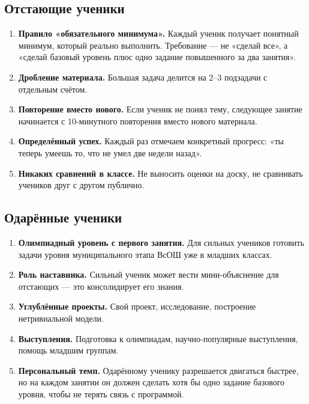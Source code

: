 \documentclass[12pt,a4paper]{article}
\begin{document}
\subsection{Отстающие ученики}

\begin{enumerate}
  \item \textbf{Правило «обязательного минимума».} Каждый ученик
  получает понятный минимум, который реально выполнить. Требование
  --- не «сделай все», а «сделай базовый уровень плюс одно задание
  повышенного за два занятия».
  \item \textbf{Дробление материала.} Большая задача делится на
  2--3 подзадачи с отдельным счётом.
  \item \textbf{Повторение вместо нового.} Если ученик не понял тему,
  следующее занятие начинается с 10-минутного повторения вместо
  нового материала.
  \item \textbf{Определённый успех.} Каждый раз отмечаем конкретный
  прогресс: «ты теперь умеешь то, что не умел две недели назад».
  \item \textbf{Никаких сравнений в классе.} Не выносить оценки
  на доску, не сравнивать учеников друг с другом публично.
\end{enumerate}

\subsection{Одарённые ученики}

\begin{enumerate}
  \item \textbf{Олимпиадный уровень с первого занятия.} Для сильных
  учеников готовить задачи уровня муниципального этапа ВсОШ
  уже в младших классах.
  \item \textbf{Роль наставника.} Сильный ученик может вести
  мини-объяснение для отстающих --- это консолидирует его знания.
  \item \textbf{Углублённые проекты.} Свой проект, исследование,
  построение нетривиальной модели.
  \item \textbf{Выступления.} Подготовка к олимпиадам, научно-популярные
  выступления, помощь младшим группам.
  \item \textbf{Персональный темп.} Одарённому ученику разрешается
  двигаться быстрее, но на каждом занятии он должен сделать
  хотя бы одно задание базового уровня, чтобы не терять связь с программой.
\end{enumerate}
\end{document}

